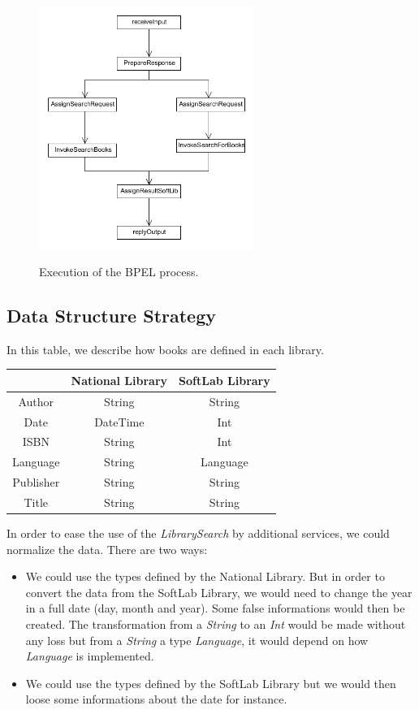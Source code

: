 \documentclass[a4paper,10pt]{article}
\begin{document}
 \begin{figure}[h]
	 \centering
 \includegraphics[width=7cm]{diagsequence.png}
 \label{fig:graph_seq}
 \caption{Execution of the BPEL process.}
\end{figure}




\subsection{Data Structure Strategy}
In this table, we describe how books are defined in each library. \\

\begin{center}
\begin{tabular}{|c|c|c|}
\hline
  & National Library & SoftLab Library \\
  \hline
  Author & String & String \\
  \hline
  Date & DateTime & Int \\
  \hline
  ISBN & String & Int \\
  \hline
  Language & String & Language \\
  \hline
  Publisher & String & String \\
  \hline
  Title & String & String \\
  \hline
\end{tabular}
\end{center}
\vspace{0.8cm}

 In order to ease the use of the \textit{LibrarySearch} by additional services, we could normalize the data. There are two ways:
 \begin{itemize}
  \item We could use the types defined by the National Library. But in order to convert the data from the SoftLab Library, we would need to change the year in a full date (day, month and year).
  Some false informations would then be created. The transformation from a \textit{String} to an \textit{Int} would be made without any loss but from a \textit{String} a type \textit{Language}, it would depend on 
  how \textit{Language} is implemented.
  \item We could use the types defined by the SoftLab Library but we would then loose some informations about the date for instance.
 \end{itemize}
 
\end{document}
